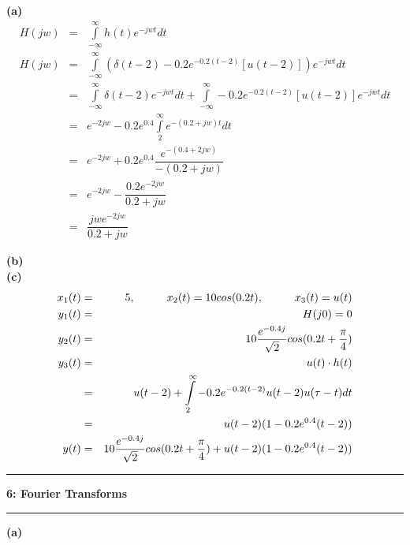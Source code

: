 \documentclass[11pt]{article}
\newcommand\question[2]{\vspace{.25in}\hrule\textbf{#1: #2}\vspace{.5em}\hrule\vspace{.10in}}
\renewcommand\part[1]{\vspace{.10in}\textbf{(#1)}}
\newcommand\tab[1][1cm]{\hspace*{#1}}
\begin{document}
\part{a} \\
\begin{eqnarray*}
	H(jw) &=& \int\limits_{-\infty}^{\infty} h(t) e^{-jwt} dt \\
	H(jw) &=& \int\limits_{-\infty}^{\infty} (\delta(t-2)-0.2e^{-0.2(t-2)}[u(t-2)]) e^{-jwt} dt \\
	&=& \int\limits_{-\infty}^{\infty} \delta(t-2) e^{-jwt} dt +  \int\limits_{-\infty}^{\infty} -0.2e^{-0.2(t-2)}[u(t-2)] e^{-jwt} dt \\
	&=& e^{-2jw} - 0.2e^{0.4} \int\limits_{2}^{\infty} e ^{-(0.2+jw)t} dt \\
	&=& e^{-2jw} + 0.2e^{0.4}\dfrac{e^{-(0.4 + 2jw)}}{-(0.2 + jw)} \\
	&=& e^{-2jw} - \dfrac{0.2e^{-2jw}}{0.2 + jw}\\
	&=& \dfrac{jwe^{-2jw}}{0.2 + jw}
\end{eqnarray*}

\part{b} \\


\part{c} \\
\begin{eqnarray*}
	x_1(t) &=& 5, \tab x_2(t) = 10cos(0.2t), \tab x_3(t)=u(t) \\
	y_1(t) &=& H(j0) = 0 \\
	y_2(t) &=& 10 \dfrac{e^{-0.4j}}{\sqrt{2}}cos(0.2t+\dfrac{\pi}{4}) \\
	y_3(t) &=& u(t) \cdot h(t) \\
	&=& u(t-2) +  \int\limits_{2}^{\infty} -0.2 e ^{-0.2(t-2)} u(t-2)u(\tau-t) dt \\
	&=& u(t-2)(1-0.2e^{0.4}(t-2)) \\
	y(t) &=& 10 \dfrac{e^{-0.4j}}{\sqrt{2}}cos(0.2t+\dfrac{\pi}{4}) + u(t-2)(1-0.2e^{0.4}(t-2)) \\
\end{eqnarray*}

\cleardoublepage

\question{6}{Fourier Transforms} 

\part{a} \\
\end{document}
